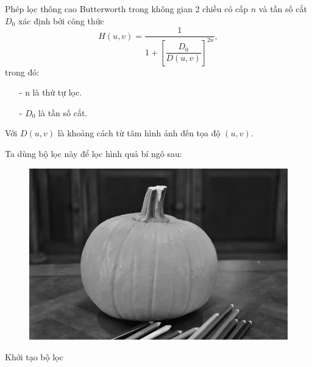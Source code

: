 \documentclass[12pt,a4paper]{report}
\numberwithin{equation}{section}
\theoremstyle{definition} %
\begin{document}
Phép lọc thông cao Butterworth trong không gian 2 chiều có cấp $n$ và tần số cắt $D_0$ xác định bởi công thức
\begin{equation}
H(u,v) = \frac{1}{1 + \left[\dfrac{D_0}{D(u,v)}\right]^{2n}},
\end{equation}
trong đó: 
\begin{enumerate}
	\item[-] n là thứ tự lọc.
	\item[-] $D_0$ là tần số cắt.

\end{enumerate}
Với $D(u,v)$ là khoảng cách từ tâm hình ảnh đến tọa độ $(u,v)$.

Ta dùng bộ lọc này để lọc hình quả bí ngô sau:

\begin{figure}[H]
\centering
\includegraphics[width=0.8\linewidth]{img/pumpkin.png}
\end{figure}
Khởi tạo bộ lọc
\end{document}
